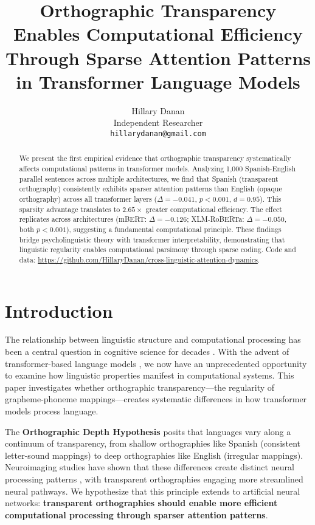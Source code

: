 \documentclass[11pt,a4paper]{article}
\title{Orthographic Transparency Enables Computational Efficiency\\
Through Sparse Attention Patterns in Transformer Language Models}
\author{Hillary Danan \\
  Independent Researcher \\
  \texttt{hillarydanan@gmail.com}}
\begin{document}
\maketitle

\begin{abstract}
We present the first empirical evidence that orthographic transparency systematically affects computational patterns in transformer models. Analyzing 1,000 Spanish-English parallel sentences across multiple architectures, we find that Spanish (transparent orthography) consistently exhibits sparser attention patterns than English (opaque orthography) across all transformer layers ($\Delta = -0.041$, $p < 0.001$, $d = 0.95$). This sparsity advantage translates to $2.65\times$ greater computational efficiency. The effect replicates across architectures (mBERT: $\Delta = -0.126$; XLM-RoBERTa: $\Delta = -0.050$, both $p < 0.001$), suggesting a fundamental computational principle. These findings bridge psycholinguistic theory with transformer interpretability, demonstrating that linguistic regularity enables computational parsimony through sparse coding. Code and data: \url{https://github.com/HillaryDanan/cross-linguistic-attention-dynamics}.
\end{abstract}

\section{Introduction}

The relationship between linguistic structure and computational processing has been a central question in cognitive science for decades \cite{chomsky1965,marr1982}. With the advent of transformer-based language models \cite{vaswani2017attention}, we now have an unprecedented opportunity to examine how linguistic properties manifest in computational systems. This paper investigates whether orthographic transparency---the regularity of grapheme-phoneme mappings---creates systematic differences in how transformer models process language.

The \textbf{Orthographic Depth Hypothesis} \cite{katz1992} posits that languages vary along a continuum of transparency, from shallow orthographies like Spanish (consistent letter-sound mappings) to deep orthographies like English (irregular mappings). Neuroimaging studies have shown that these differences create distinct neural processing patterns \cite{paulesu2000}, with transparent orthographies engaging more streamlined neural pathways. We hypothesize that this principle extends to artificial neural networks: \textbf{transparent orthographies should enable more efficient computational processing through sparser attention patterns}.
\end{document}

